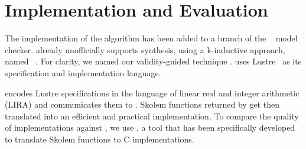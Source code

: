 \section{Implementation and Evaluation}
\label{sec:impl}

The implementation of the algorithm has been added to a branch of the  \jkind~\cite{jkind} model checker.  \jkind already unofficially supports synthesis,
using a k-inductive approach, named \jsyn~\cite{KatisFGBGW16}. For clarity, we named
our validity-guided technique \jsynvg. \jkind uses Lustre~\cite{lustrev6} as its specification and implementation language.
\iffalse
, which functions as an intermediate representation to the Architecture Analysis and Design Language (\textsc{AADL})~\cite{feiler2006architecture}.
The latter is a high-level specification and analysis language with which
contracts are expressed, using the Assume-Guarantee Reasoning (\textsc{AGREE})
framework~\cite{NFM2012:CoGaMiWhLaLu}.
\andrew{it seems strange to be talking about AADL and maybe even AGREE  at all here.}

\fi
%
\jsynvg encodes Lustre specifications in the language of
linear real and integer arithmetic (LIRA)
and communicates them to \aeval.
%
%
Skolem functions returned by \aeval get then translated %
into an efficient and practical implementation. To compare the quality of implementations against \jsyn, we use
\smtlibtoc, a tool that has been specifically developed to translate
  Skolem functions to C implementations.




